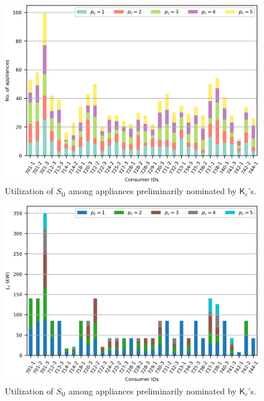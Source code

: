 \documentclass[journal, a4paper]{IEEEtran}
\begin{document}
\begin{figure}[t!]
	\centering
	\includegraphics[scale=1.0]{37NTF-B ACPL}
	\caption{Utilization of $S_{\mathsf{U}}$ among appliances preliminarily nominated by $\mathsf{K}_{c}$'s.}
\end{figure}

\begin{figure}[t!]
	\centering
	\includegraphics[scale=1.0]{37NTF-C TRPL}
	\caption{Utilization of $S_{\mathsf{U}}$ among appliances preliminarily nominated by $\mathsf{K}_{c}$'s.}
\end{figure}
\end{document}
